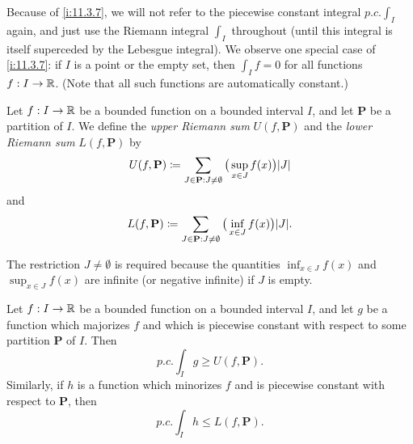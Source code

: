 \begin{rmk}\label{i:11.3.8}
  Because of \cref{i:11.3.7}, we will not refer to the piecewise constant integral \(p.c. \int_I\) again, and just use the Riemann integral \(\int_I\) throughout
  (until this integral is itself superceded by the Lebesgue integral).
  We observe one special case of \cref{i:11.3.7}:
  if \(I\) is a point or the empty set, then \(\int_I f = 0\) for all functions \(f : I \to \mathbb{R}\).
  (Note that all such functions are automatically constant.)
\end{rmk}

\begin{defn}\label{i:11.3.9}
  Let \(f : I \to \mathbb{R}\) be a bounded function on a bounded interval \(I\), and let \(\mathbf{P}\) be a partition of \(I\).
  We define the \emph{upper Riemann sum} \(U(f, \mathbf{P})\) and the \emph{lower Riemann sum} \(L(f, \mathbf{P})\) by
  \[
    U(f, \mathbf{P}) \coloneqq \sum_{J \in \mathbf{P} : J \neq \emptyset} \big(\sup_{x \in J} f(x)\big) \abs{J}
  \]
  and
  \[
    L(f, \mathbf{P}) \coloneqq \sum_{J \in \mathbf{P} : J \neq \emptyset} \big(\inf_{x \in J} f(x)\big) \abs{J}.
  \]
\end{defn}

\begin{rmk}\label{i:11.3.10}
  The restriction \(J \neq \emptyset\) is required because the quantities \(\inf_{x \in J} f(x)\) and \(\sup_{x \in J} f(x)\) are infinite (or negative infinite) if \(J\) is empty.
\end{rmk}

\begin{lem}\label{i:11.3.11}
  Let \(f : I \to \mathbb{R}\) be a bounded function on a bounded interval \(I\), and let \(g\) be a function which majorizes \(f\) and which is piecewise constant with respect to some partition \(\mathbf{P}\) of \(I\).
  Then
  \[
    p.c. \int_I g \geq U(f, \mathbf{P}).
  \]
  Similarly, if \(h\) is a function which minorizes \(f\) and is piecewise constant with respect to \(\mathbf{P}\), then
  \[
    p.c. \int_I h \leq L(f, \mathbf{P}).
  \]
\end{lem}

